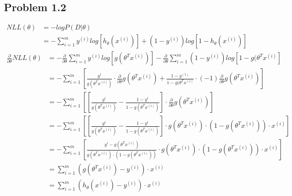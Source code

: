 \documentclass[12pt]{article}
\begin{document}
\subsection*{Problem 1.2}
\begin{equation} \label{eq2}
\begin{split}
NLL(\theta)  & =-logP(D|\theta) \\
 & =-\sum\limits_{i=1}^m y^{(i)}log[h_\theta (x^{(i)})] + (1-y^{(i)}) log[1 - h_\theta (x^{(i)})] 
\end{split}
\end{equation}
\begin{equation} \label{eq3}
\begin{split}
\frac{\partial }{\partial \theta} NLL(\theta)  & =  -\frac{\partial }{\partial \theta} \sum\limits_{i=1}^m y^{(i)}log[ g(\theta ^{T} x^{(i)})] - \frac{\partial }{\partial \theta} \sum\limits_{i=1}^m (1-y^{(i)} ) log[1 - g(\theta ^{T} x^{(i)}] \\
 &= -\sum\limits_{i=1}^m [\frac{y^{i}}{g(\theta ^{T} x^{(i)})} \cdot \frac{\partial }{\partial \theta} g(\theta ^{T} x^{(i)}) + \frac{1-y^{(1)}}{1-g(\theta ^{T} x^{(i)}} \cdot(-1) \frac{\partial }{\partial \theta}  g(\theta ^{T} x^{(i)})]\\
  &=-\sum\limits_{i=1}^m [[\frac{y^{i}}{g(\theta ^{T} x^{(i)})} - \frac{1-y^{i}}{1-g(\theta ^{T} x^{(i)})}] \cdot \frac{\partial }{\partial \theta}  g(\theta ^{T} x^{(i)})]\\
  &=-\sum\limits_{i=1}^m [[\frac{y^{i}}{g(\theta ^{T} x^{(i)})} - \frac{1-y^{i}}{1-g(\theta ^{T} x^{(i)})}] \cdot  g(\theta ^{T} x^{(i)}) \cdot (1-g(\theta ^{T} x^{(i)})) \cdot x^{(i)}]\\
  &= -\sum\limits_{i=1}^m [\frac{y^{i} - g(\theta ^{T} x^{(i)})}{g(\theta ^{T} x^{(i)}) \cdot (1-g(\theta ^{T} x^{(i)}))}  \cdot  g(\theta ^{T} x^{(i)}) \cdot (1-g(\theta ^{T} x^{(i)})) \cdot x^{(i)}]\\
  &= \sum\limits_{i=1}^m ( g(\theta ^{T} x^{(i)}) - y^{(i)} )  \cdot x^{(i)}\\
  &= \sum\limits_{i=1}^m ( h_\theta (x^{(i)}) - y^{(i)} )  \cdot x^{(i)}\
\end{split}
\end{equation}
\end{document}
